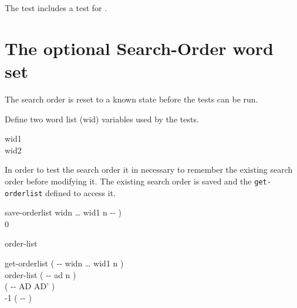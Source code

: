 The test  includes a test for .





\section{The optional Search-Order word set} %

The search order is reset to a known state before the tests can be
run.

\begin{tt}
  
\end{tt}

Define two word list (wid) variables used by the tests.

\begin{tt}
 wid1 \\
 wid2
\end{tt}

In order to test the search order it in necessary to remember the
existing search order before modifying it.  The existing search order
is saved and the \texttt{get-orderlist} defined to access it.

\begin{tt}
\word{:} save-orderlist  widn {\ldots} wid1 n -{}- ) \\
\tab {} \word{,} 0  \word{,}  \\
\word{;}

 order-list \\

\word{:} get-orderlist  ( -{}- widn {\ldots} wid1 n ) \\
\tab order-list   	\tab[1] ( -{}- ad n ) \\
\tab {} \word{+}							\tab[10.5] ( -{}- AD AD' ) \\
\tab {}   -1   \tab[1]  ( -{}- ) \\
\word{;}
\end{tt}

